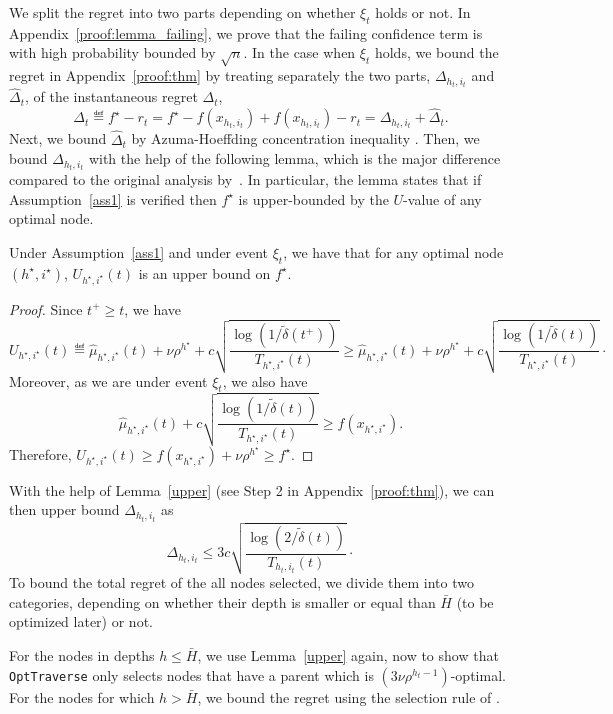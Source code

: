 We split the regret into two parts depending on whether $\xi_t$ holds or not.
In Appendix~\ref{proof:lemma_failing}, we prove that the failing confidence term is with high probability bounded by $\sqrt{n}$. In the case when  $\xi_t$ holds, we bound the regret in Appendix~\ref{proof:thm}
by treating separately the two parts, $\Delta_{h_t,i_t}$ and $\hat{\Delta}_t$, of the instantaneous regret $\Delta_t$,
\[
\Delta_t \eqdef f^\star - r_t = f^\star - f(x_{h_t,i_t}) + f(x_{h_t,i_t}) - r_t = \Delta_{h_t,i_t} + \hat{\Delta}_t.
\]
Next, we bound $ \hat{\Delta}_t$ by Azuma-Hoeffding concentration inequality \citep{azuma1967}.
Then, we bound $ \Delta_{h_t,i_t}$  with the help of the following lemma, which is the major difference compared to the original \HCT analysis by~\cite{azar2014online}. In particular, the lemma states that
if Assumption~\ref{ass1} is verified then
 $f^\star$ is upper-bounded by the $U$-value of any optimal node.
\begin{lemma}\label{upper}
	Under Assumption~\ref{ass1} and under event $\xi_t$, we have that for any optimal node $(h^\star,i^\star)$, $U_{h^\star,i^\star}(t)$ is an upper bound on $f^\star$.
\end{lemma}

\begin{proof}
Since $t^+ \geq t$, we have
\[
	U_{h^\star,i^\star}(t) \eqdef \hat{\mu}_{h^\star,i^\star}(t) + \nu\rho^{h^\star} + c\sqrt{\frac{\operatorname{log}(1/\tilde{\delta}(t^+))}{T_{h^\star,i^\star}(t)}} \geq \hat{\mu}_{h^\star,i^\star}(t) + \nu\rho^{h^\star} + c\sqrt{\frac{\operatorname{log}(1/\tilde{\delta}(t))}{T_{h^\star,i^\star}(t)}}\cdot
\]
Moreover, as we are under event $\xi_t$, we also have
\[
	\hat{\mu}_{h^\star,i^\star}(t) + c\sqrt{\frac{\operatorname{log}(1/\tilde{\delta}(t))}{T_{h^\star,i^\star}(t)}} \geq f\left(x_{h^\star,i^\star}\right).
\]
Therefore, $U_{h^\star,i^\star}(t) \geq f(x_{h^\star,i^\star}) + \nu\rho^{h^\star} \geq f^\star$.
\end{proof}
\noindent With the help of Lemma~\ref{upper} (see Step 2 in Appendix~\ref{proof:thm}), we can then upper bound $\Delta_{h_t,i_t}$ as
\[
\Delta_{h_t,i_t} \leq 3c\sqrt{\frac{\operatorname{log}(2/\tilde{\delta}(t))}{T_{h_t,i_t}(t)}}\cdot%
\]
To bound the total regret of the all nodes selected, we divide them
into two categories, depending on whether their depth is smaller or equal than $\bar H$
(to be optimized later) or not.

For the nodes in depths $h \leq \bar H$, we  use
Lemma~\ref{upper} again, now to show that \texttt{OptTraverse} only selects nodes
that have a parent which is $(3\nu\rho^{h_t-1})$-optimal.
For the nodes for which  $h > \bar H$, we bound the regret using the
selection rule of \HCT.


